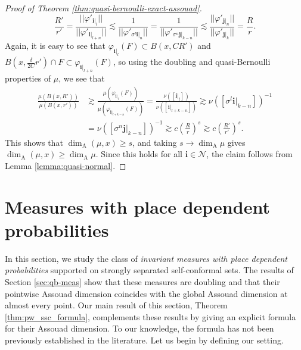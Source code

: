 \documentclass{PRM}
\theoremstyle{plain}
\theoremstyle{definition}
\theoremstyle{remark}
\begin{document}
\begin{proof}[Proof of Theorem \ref{thm:quasi-bernoulli-exact-assouad}]
\begin{equation*}
    \frac{R'}{r'}=\frac{||\varphi'_{\mathbf{i}|_{l}}||}{||\varphi'_{\mathbf{i}|_{l+n}}||}\lesssim \frac{1}{||\varphi'_{\sigma^l\mathbf{i}|_{n}}||}=\frac{1}{||\varphi'_{\sigma^{n}\mathbf{j}|_{k-n}}||}\lesssim\frac{ ||\varphi'_{\mathbf{j}|_{n}}||}{||\varphi'_{\mathbf{j}|_{k}}||}=\frac{R}{r}.
\end{equation*}
Again, it is easy to see that $\varphi_{\mathbf{i}|_{l}}(F)\subset B(x,CR')$ and $B(x,\frac{\delta}{2C}r')\cap F\subset \varphi_{\mathbf{i}|_{l+n}}(F)$, so using the doubling and quasi-Bernoulli properties of $\mu$, we see that
\begin{align*}
    \frac{\mu(B(x,R'))}{\mu(B(x,r'))}&\gtrsim\frac{\mu(\varphi_{\mathbf{i}|_{l}}(F))}{\mu(\varphi_{\mathbf{i}|_{l+k-n}}(F))}=\frac{\nu([\mathbf{i}|_{l}])}{\nu([\mathbf{i}|_{l+k-n}])}\gtrsim \nu([\sigma^l\mathbf{i}|_{k-n}])^{-1}\\
    &=\nu([\sigma^{n}\mathbf{j}|_{k-n}])^{-1} \gtrsim c\left(\frac{R}{r}\right)^s\gtrsim c\left(\frac{R'}{r'}\right)^s.
\end{align*}
This shows that $\dim_{\mathrm{A}}(\mu,x)\geq s$, and taking $s\to\dim_{\mathrm{A}}\mu$ gives $\dim_{\mathrm{A}}(\mu,x)\geq \dim_{\mathrm{A}}\mu$. Since this holds for all $\mathbf{i}\in\mathcal{N}$, the claim follows from Lemma \ref{lemma:quasi-normal}.
\end{proof}


\section{Measures with place dependent probabilities}\label{sec:invmeas}
In this section, we study the class of \emph{invariant measures with place dependent probabilities} supported on strongly separated self-conformal sets. The results of Section \ref{sec:qb-meas} show that these measures are doubling and that their pointwise Assouad dimension coincides with the global Assouad dimension at almost every point. Our main result of this section, Theorem \ref{thm:pw_ssc_formula}, complements these results by giving an explicit formula for their Assouad dimension. To our knowledge, the formula has not been previously established in the literature. Let us begin by defining our setting.
\end{document}
